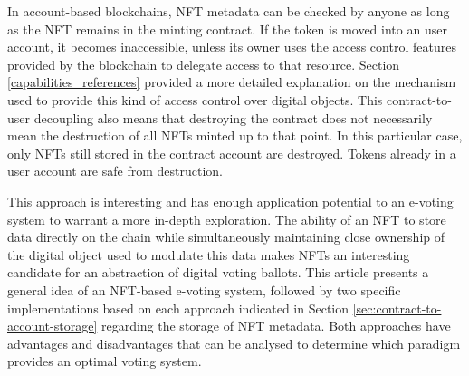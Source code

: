\documentclass[../3_VotingAndNFTs.tex]{subfiles}
\begin{document}
        In account-based blockchains, NFT metadata can be checked by anyone as long as the NFT remains in the minting contract. If the token is moved into an user account, it becomes inaccessible, unless its owner uses the access control features provided by the blockchain to delegate access to that resource. Section \ref{capabilities_references} provided a more detailed explanation on the mechanism used to provide this kind of access control over digital objects. This contract-to-user decoupling also means that destroying the contract does not necessarily mean the destruction of all NFTs minted up to that point. In this particular case, only NFTs still stored in the contract account are destroyed. Tokens already in a user account are safe from destruction.
        \par
        This approach is interesting and has enough application potential to an e-voting system to warrant a more in-depth exploration. The ability of an NFT to store data directly on the chain while simultaneously maintaining close ownership of the digital object used to modulate this data makes NFTs an interesting candidate for an abstraction of digital voting ballots. This article presents a general idea of an NFT-based e-voting system, followed by two specific implementations based on each approach indicated in Section \ref{sec:contract-to-account-storage} regarding the storage of NFT metadata. Both approaches have advantages and disadvantages that can be analysed to determine which paradigm provides an optimal voting system.
\end{document}
